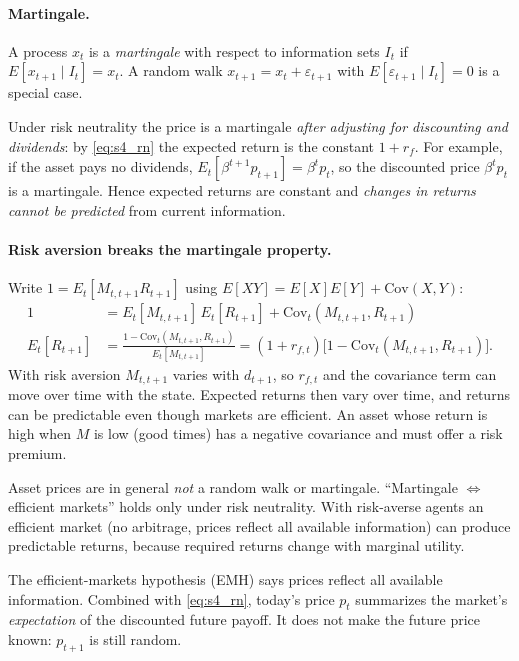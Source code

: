 \paragraph{Martingale.} A process $x_t$ is a \emph{martingale} with respect to information sets $I_t$ if $E[x_{t+1}\mid I_t]=x_t$. A random walk $x_{t+1}=x_t+\varepsilon_{t+1}$ with $E[\varepsilon_{t+1}\mid I_t]=0$ is a special case.

Under risk neutrality the price is a martingale \emph{after adjusting for discounting and dividends}: by \eqref{eq:s4_rn} the expected return is the constant $1+r_f$. For example, if the asset pays no dividends, $E_t[\beta^{t+1}p_{t+1}]=\beta^tp_t$, so the discounted price $\beta^tp_t$ is a martingale. Hence expected returns are constant and \emph{changes in returns cannot be predicted} from current information.

\paragraph{Risk aversion breaks the martingale property.}
Write $1=E_t[M_{t,t+1}R_{t+1}]$ using $E[XY]=E[X]E[Y]+\mathrm{Cov}(X,Y)$:
\begin{align*}
  1 &= E_t[M_{t,t+1}]\,E_t[R_{t+1}] + \mathrm{Cov}_t(M_{t,t+1},R_{t+1})\\
  E_t[R_{t+1}] &= \frac{1-\mathrm{Cov}_t(M_{t,t+1},R_{t+1})}{E_t[M_{t,t+1}]}
  = (1+r_{f,t})\big[1-\mathrm{Cov}_t(M_{t,t+1},R_{t+1})\big].
\end{align*}
With risk aversion $M_{t,t+1}$ varies with $d_{t+1}$, so $r_{f,t}$ and the covariance term can move over time with the state. Expected returns then vary over time, and returns can be predictable even though markets are efficient. An asset whose return is high when $M$ is low (good times) has a negative covariance and must offer a risk premium.

\begin{keybox}[title=Lucas takeaway]
Asset prices are in general \emph{not} a random walk or martingale. ``Martingale $\Leftrightarrow$ efficient markets'' holds only under risk neutrality. With risk-averse agents an efficient market (no arbitrage, prices reflect all available information) can produce predictable returns, because required returns change with marginal utility.
\end{keybox}
The efficient-markets hypothesis (EMH) says prices reflect all available information. Combined with \eqref{eq:s4_rn}, today's price $p_t$ summarizes the market's \emph{expectation} of the discounted future payoff. It does not make the future price known: $p_{t+1}$ is still random.

